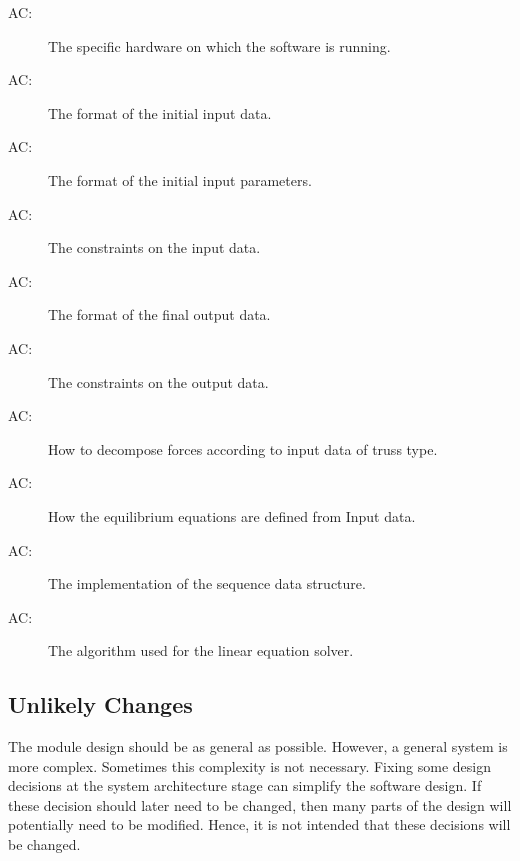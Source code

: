 \documentclass[12pt, titlepage]{article}
\newcounter{acnum}
\newcommand{\actheacnum}{AC\theacnum}
\begin{document}
\begin{description}
\item[ \actheacnum \label{acHardware}:] The specific
  hardware on which the software is running.
\item[ \actheacnum \label{acInput}:] The format of the
  initial input data.
 \item[ \actheacnum \label{acParam}:] The format of the
  initial input parameters.
  \item[ \actheacnum \label{acVerify}:] The constraints on the input data.
\item[ \actheacnum \label{acOutput}:] The format of the final output data.  
\item[ \actheacnum \label{acOutVeri}:] The constraints on the output data.
\item[ \actheacnum \label{acDecompos}:] How to decompose forces according to input data of truss type.
\item[ \actheacnum \label{acEq}:] How the equilibrium equations are defined from Input data.
\item[ \actheacnum \label{acSeq}:] The implementation of the sequence data structure.
\item[ \actheacnum \label{acLinalg}:] The algorithm used for the linear equation solver.
 
\end{description}

\subsection{Unlikely Changes} \label{SecUchange}

The module design should be as general as possible. However, a general system is
more complex. Sometimes this complexity is not necessary. Fixing some design
decisions at the system architecture stage can simplify the software design. If
these decision should later need to be changed, then many parts of the design
will potentially need to be modified. Hence, it is not intended that these
decisions will be changed.
\end{document}
